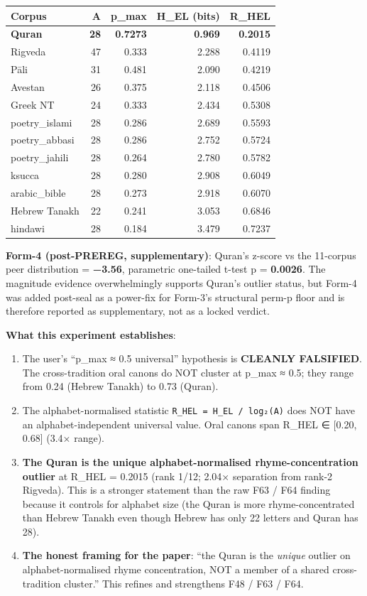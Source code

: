 \documentclass[
]{article}
\newcounter{none} %
\begin{document}
{\def\LTcaptype{none} %
\begin{longtable}[]{@{}lrrrr@{}}
\toprule\noalign{}
Corpus & A & p\_max & H\_EL (bits) & \textbf{R\_HEL} \\
\midrule\noalign{}
\endhead
\bottomrule\noalign{}
\endlastfoot
\textbf{Quran} & \textbf{28} & \textbf{0.7273} & \textbf{0.969} &
\textbf{0.2015} \\
Rigveda & 47 & 0.333 & 2.288 & 0.4119 \\
Pāli & 31 & 0.481 & 2.090 & 0.4219 \\
Avestan & 26 & 0.375 & 2.118 & 0.4506 \\
Greek NT & 24 & 0.333 & 2.434 & 0.5308 \\
poetry\_islami & 28 & 0.286 & 2.689 & 0.5593 \\
poetry\_abbasi & 28 & 0.286 & 2.752 & 0.5724 \\
poetry\_jahili & 28 & 0.264 & 2.780 & 0.5782 \\
ksucca & 28 & 0.280 & 2.908 & 0.6049 \\
arabic\_bible & 28 & 0.273 & 2.918 & 0.6070 \\
Hebrew Tanakh & 22 & 0.241 & 3.053 & 0.6846 \\
hindawi & 28 & 0.184 & 3.479 & 0.7237 \\
\end{longtable}
}

\textbf{Form-4 (post-PREREG, supplementary)}: Quran's z-score vs the
11-corpus peer distribution = \textbf{−3.56}, parametric one-tailed
t-test p = \textbf{0.0026}. The magnitude evidence overwhelmingly
supports Quran's outlier status, but Form-4 was added post-seal as a
power-fix for Form-3's structural perm-p floor and is therefore reported
as supplementary, not as a locked verdict.

\textbf{What this experiment establishes}:

\begin{enumerate}
\def\labelenumi{\arabic{enumi}.}
\item
  The user's ``p\_max ≈ 0.5 universal'' hypothesis is \textbf{CLEANLY
  FALSIFIED}. The cross-tradition oral canons do NOT cluster at p\_max ≈
  0.5; they range from 0.24 (Hebrew Tanakh) to 0.73 (Quran).
\item
  The alphabet-normalised statistic
  \texttt{R\_HEL\ =\ H\_EL\ /\ log₂(A)} does NOT have an
  alphabet-independent universal value. Oral canons span R\_HEL ∈
  {[}0.20, 0.68{]} (3.4× range).
\item
  \textbf{The Quran is the unique alphabet-normalised
  rhyme-concentration outlier} at R\_HEL = 0.2015 (rank 1/12; 2.04×
  separation from rank-2 Rigveda). This is a stronger statement than the
  raw F63 / F64 finding because it controls for alphabet size (the Quran
  is more rhyme-concentrated than Hebrew Tanakh even though Hebrew has
  only 22 letters and Quran has 28).
\item
  \textbf{The honest framing for the paper}: ``the Quran is the
  \emph{unique} outlier on alphabet-normalised rhyme concentration, NOT
  a member of a shared cross-tradition cluster.'' This refines and
  strengthens F48 / F63 / F64.
\end{enumerate}
\end{document}
